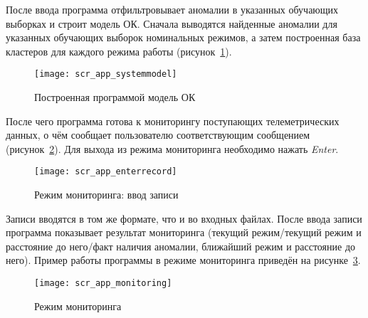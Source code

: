 После ввода программа отфильтровывает аномалии в указанных обучающих выборках и строит модель ОК. Сначала выводятся найденные аномалии для указанных обучающих выборок номинальных режимов, а затем построенная база кластеров для каждого режима работы (рисунок~\ref{fig:spec:scr:SystemModel}).

\begin{figure}[h]
\texttt{[image: scr\_app\_systemmodel]}
\caption{Построенная программой модель ОК}
\label{fig:spec:scr:SystemModel}
\end{figure}

После чего программа готова к мониторингу поступающих телеметрических данных, о чём сообщает пользователю соответствующим сообщением (рисунок~\ref{fig:spec:scr:EnterRecord}). Для выхода из режима мониторинга необходимо нажать \textit{Enter}.

\begin{figure}[h]
\texttt{[image: scr\_app\_enterrecord]}
\caption{Режим мониторинга: ввод записи}
\label{fig:spec:scr:EnterRecord}
\end{figure}

Записи вводятся в том же формате, что и во входных файлах. После ввода записи программа показывает результат мониторинга (текущий режим/текущий режим и расстояние до него/факт наличия аномалии, ближайший режим и расстояние до него). Пример работы программы в режиме мониторинга приведён на рисунке~\ref{fig:spec:scr:Monitoring}.

\begin{figure}[h]
\texttt{[image: scr\_app\_monitoring]}
\caption{Режим мониторинга}
\label{fig:spec:scr:Monitoring}
\end{figure}
